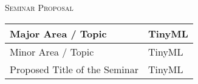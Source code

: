 \documentclass[a4paper, 11pt]{article}
\begin{document}
\renewcommand\arraystretch{2.0}

\begin{center}
    \Large \textsc{Seminar Proposal}
    \vspace{10pt}
\end{center}

\begin{center}
    \begin{tabularx} {\textwidth} {
            | >{\centering\arraybackslash}m{6cm} |
            >{\centering\arraybackslash}X |
        }
        \hline

        Major Area / Topic & TinyML \\ \hline
        Minor Area / Topic & TinyML \\ \hline
        Proposed Title of the Seminar & TinyML \\

        \hline

    \end{tabularx}
\end{center}
\end{document}
